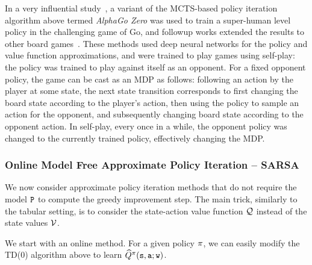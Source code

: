 \begin{remark}
    In a very influential study~\cite{silver2017mastering}, a variant of the MCTS-based policy iteration algorithm above termed \emph{AlphaGo Zero} was used to train a super-human level policy in the challenging game of Go, and followup works extended the results to other board games~\cite{silver2018general}. These methods used deep neural networks for the policy and value function approximations, and were trained to play games using self-play: the policy was trained to play against itself as an opponent. For a fixed opponent policy, the game can be cast as an MDP as follows: following an action by the player at some state, the next state transition corresponds to first changing the board state according to the player's action, then using the policy to sample an action for the opponent, and subsequently changing board state according to the opponent action. In self-play, every once in a while, the opponent policy was changed to the currently trained policy, effectively changing the MDP.
\end{remark}

\subsubsection{Online Model Free Approximate Policy Iteration -- SARSA}

We now consider approximate policy iteration methods that do not require the model ${\tt P}$ to compute the greedy improvement step. The main trick, similarly to the tabular setting, is to consider the state-action value function $\mathcal{Q}$ instead of the state values $\mathcal{V}$.


We start with an online method. For a given policy $\pi$, we can easily modify the TD(0) algorithm above to learn $\widehat{Q}^\pi({\tt s},{\tt a};{\tt w})$.

